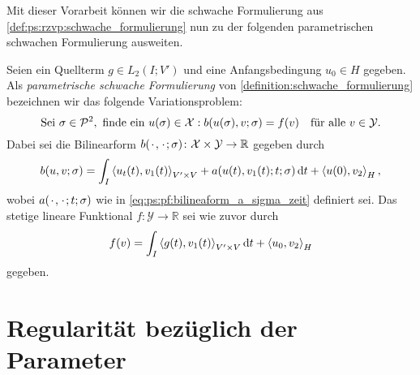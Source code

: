 Mit dieser Vorarbeit können wir die schwache Formulierung aus \cref{def:ps:rzvp:schwache_formulierung} nun zu der folgenden parametrischen schwachen Formulierung ausweiten.

\begin{Definition}
\label{def:ps:pf:schwache_formulierung}
    Seien ein Quellterm $g \in L_{2}(I; V')$ und eine Anfangsbedingung $u_{0} \in H$ gegeben.
    Als \emph{parametrische schwache Formulierung} von \cref{definition:schwache_formulierung} bezeichnen wir das folgende Variationsproblem:
    \begin{equation}
        \text{Sei}~\sigma \in \mathcal P^{2},~\text{finde ein}~u(\sigma) \in \mathcal X : b(u(\sigma), v; \sigma) = f(v) \quad \fa v \in \mathcal Y.
    \end{equation}
    Dabei sei die Bilinearform $b(\blank, \blank; \sigma) \colon \mathcal X \times \mathcal Y \to \mathbb{R}$ gegeben durch
     \begin{equation}
         \label{eq:ps:rzvp:schwache_formulierung_lhs_b_sigma}
         b(u, v; \sigma)
             = \int_{I} \skprod{u_{t}(t)}{v_{1}(t)}_{V' \times V} + a(u(t), v_{1}(t); t; \sigma) \diff t + \skprod{u(0)}{v_{2}}_{H},
     \end{equation}
     wobei $a(\blank, \blank; t; \sigma)$ wie in \cref{eq:ps:pf:bilineaform_a_sigma_zeit} definiert sei.
     Das stetige lineare Funktional $f \colon \mathcal Y \to \mathbb{R}$ sei wie zuvor durch
     \begin{equation}
         \label{eq:ps:rzvp:schwache_formulierung_rhs_f_sigma}
         f(v) = \int_{I} \skprod{g(t)}{v_{1}(t)}_{V' \times V} \diff t + \skprod{u_{0}}{v_{2}}_{H}
     \end{equation}
     gegeben.
\end{Definition}



\section{Regularität bezüglich der Parameter} %
\label{sec:ps:rg:regularitaet_bezueglich_der_parameter}


